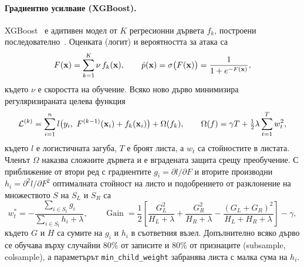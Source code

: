\paragraph{Градиентно усилване (XGBoost).} XGBoost~\cite{chen2016} е адитивен модел от $K$ регресионни дървета $f_k$, построени последователно~\cite{friedman2001}. Оценката (логит) и вероятността за атака са
\begin{equation}\label{eq:xgb-model}
F(\mathbf{x})=\sum_{k=1}^{K}\nu\,f_k(\mathbf{x}),\qquad \hat{p}(\mathbf{x})=\sigma\bigl(F(\mathbf{x})\bigr)=\frac{1}{1+e^{-F(\mathbf{x})}},
\end{equation}
където $\nu$ е скоростта на обучение. Всяко ново дърво минимизира регуляризираната целева функция
\begin{equation}\label{eq:xgb-obj}
\mathcal{L}^{(k)}=\sum_{i=1}^{n}l\bigl(y_i,\ F^{(k-1)}(\vect{x}_i)+f_k(\vect{x}_i)\bigr)+\Omega(f_k),\qquad \Omega(f)=\gamma T+\tfrac12\lambda\sum_{t=1}^{T}w_t^2,
\end{equation}
където $l$ е логистичната загуба, $T$ е броят листа, а $w_t$ са стойностите в листата. Членът $\Omega$ наказва сложните дървета и е вградената защита срещу преобучение. С приближение от втори ред с градиентите $g_i=\partial l/\partial F$ и вторите производни $h_i=\partial^2 l/\partial F^2$ оптималната стойност на листо и подобрението от разклонение на множеството $S$ на $S_L$ и $S_R$ са
\begin{equation}\label{eq:xgb-gain}
w_t^{*}=-\frac{\sum_{i\in S_t}g_i}{\sum_{i\in S_t}h_i+\lambda},\qquad
\operatorname{Gain}=\frac12\left[\frac{G_L^2}{H_L+\lambda}+\frac{G_R^2}{H_R+\lambda}-\frac{(G_L+G_R)^2}{H_L+H_R+\lambda}\right]-\gamma,
\end{equation}
където $G$ и $H$ са сумите на $g_i$ и $h_i$ в съответния възел. Допълнително всяко дърво се обучава върху случайни 80\% от записите и 80\% от признаците (subsample, colsample), а параметърът \texttt{min\_child\_weight} забранява листа с малка сума на $h_i$.

